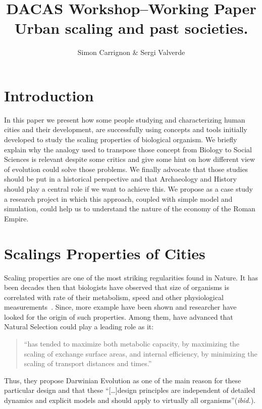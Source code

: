 \documentclass[a4paper,11pt]{article}
\title{DACAS Workshop--Working Paper\\
 Urban scaling and past societies.
}
\author{Simon Carrignon \& Sergi Valverde}
\date{}
\begin{document}
\maketitle

\section{Introduction}

In this paper we present how some people studying and characterizing human cities and their development, are successfully using concepts and tools initially developed to study the scaling properties of biological organism. We briefly explain why the analogy used to transpose those concept from Biology to Social Sciences is relevant despite some critics and give some hint on how different view of evolution could solve those problems. We finally advocate that those studies should be put in a historical perspective and that Archaeology and History should play a central role if we want to achieve this. We propose as a case study a research project in which this approach, coupled with simple model and simulation, could help us to understand the nature of the economy of the Roman Empire.


\section{Scalings Properties of Cities}
Scaling properties are one of the most striking regularities found in Nature. It has been decades then that biologists have observed that size of organisms is correlated with rate of their metabolism, speed and other physiological measurements~\citep{schmidtnielsen1984scalingwhyisanimalsizesoimportant}. Since, more example have been shown and researcher have looked for the origin of such properties. Among them, \cite{west1999thefourthdimensionoflifefractalgeometryandallometricscalingoforganisms}
have advanced that Natural Selection could play a leading role as it:
\begin{quote}
    ``has tended to maximize both metabolic capacity, by maximizing the scaling of exchange surface areas, and internal efficiency, by minimizing the scaling of transport distances and times.'' 
\end{quote}

Thus, they propose Darwinian Evolution as one of the main reason for these particular design and that these ``[\ldots]design principles are independent of detailed dynamics and explicit models and should apply to  virtually all organisms''(\emph{ibid.}).
\end{document}
